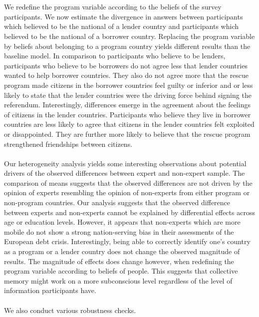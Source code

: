 \documentclass[12pt]{article}
\begin{document}
\\\\
We redefine the program variable according to the beliefs of the survey participants. We now estimate the divergence in answers between participants which believed to be the national of a  lender country and participants which believed to be the national of a borrower country. Replacing the program variable by beliefs about belonging to a program country yields different results than the baseline model. In comparison to participants who believe to be lenders, participants who believe to be borrowers do not agree less that lender countries wanted to help borrower countries. They also do not agree more that the rescue program made citizens in the borrower countries feel guilty or inferior and or less likely to state that the lender countries were the driving force behind signing the referendum. Interestingly, differences emerge in the agreement about the feelings of citizens in the lender countries. Participants who believe they live in borrower countries are less likely to agree that citizens in the lender countries felt exploited or disappointed. They are further more likely to believe that the rescue program strengthened friendships between citizens. \\

\\
Our heterogeneity analysis yields some interesting observations about potential drivers of the observed differences between expert and non-expert sample. The comparison of means suggests that the observed differences are not driven by the opinion of experts resembling the opinion of non-experts from either program or non-program countries. 
Our analysis suggests that the observed difference between experts and non-experts cannot be explained by differential effects across age or education levels. However, it appears that non-experts which are more mobile do not show a strong nation-serving bias in their assessments of the European debt crisis. Interestingly, being able to correctly identify one's country as a program or a lender country does not change the observed magnitude of results. The magnitude of effects does change however, when redefining the program variable according to beliefs of people. This suggests that collective memory might work on a more subconscious level regardless of the level of information participants have. 
\\
\\
We also conduct various robustness checks. \\
\end{document}
